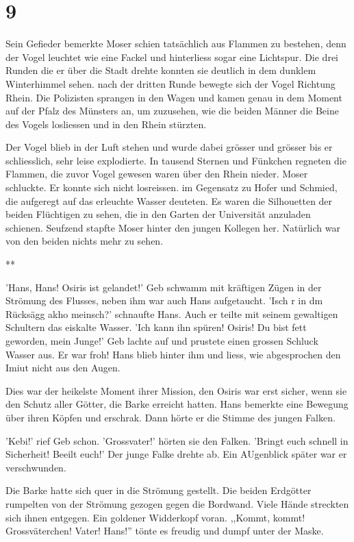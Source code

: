\documentclass[11pt,titlepage,a5paper]{book}
\newcommand{\sterne}{\par{\centering ***\par}}
\begin{document}
\section*{9}

Sein Gefieder bemerkte Moser schien tatsächlich aus Flammen zu bestehen, denn der Vogel leuchtet wie eine Fackel und hinterliess sogar eine Lichtspur. Die drei Runden die er über die Stadt drehte konnten sie deutlich in dem dunklem Winterhimmel sehen. nach der dritten Runde bewegte sich der Vogel Richtung Rhein. Die Polizisten sprangen in den Wagen und kamen genau in dem Moment auf der Pfalz des Münsters an, um zuzusehen, wie die beiden Männer die Beine des Vogels losliessen und in den Rhein stürzten. 


Der Vogel blieb in der Luft stehen und wurde dabei grösser und grösser bis er schliesslich, sehr leise explodierte. In tausend Sternen und Fünkchen regneten die Flammen, die zuvor Vogel gewesen waren über den Rhein nieder. Moser schluckte. Er konnte sich nicht losreissen. im Gegensatz zu Hofer und Schmied, die aufgeregt auf das erleuchte Wasser deuteten. Es waren die Silhouetten der beiden Flüchtigen zu sehen, die in den Garten der Universität anzuladen schienen. Seufzend stapfte Moser hinter den jungen Kollegen her. Natürlich war von den beiden nichts mehr zu sehen.

\sterne

'Hans, Hans! Osiris ist gelandet!' Geb schwamm mit kräftigen Zügen in der Strömung des Flusses, neben ihm war auch Hans aufgetaucht. 'Isch r in dm Rücksägg akho meinsch?' schnaufte Hans. Auch er teilte mit seinem gewaltigen Schultern das eiskalte Wasser. 'Ich kann ihn spüren! Osiris! Du bist fett geworden, mein Junge!' Geb lachte auf und prustete einen grossen Schluck Wasser aus. Er war froh! Hans blieb hinter ihm und liess, wie abgesprochen den Imiut nicht aus den Augen.

Dies war der heikelste Moment ihrer Mission, den Osiris war erst sicher, wenn sie den Schutz aller Götter, die Barke erreicht hatten. Hans bemerkte eine Bewegung über ihren Köpfen und erschrak. Dann hörte er die Stimme des jungen Falken.

'Kebi!' rief Geb schon. 'Grossvater!' hörten sie den Falken. 'Bringt euch schnell in Sicherheit! Beeilt euch!' Der junge Falke drehte ab. Ein AUgenblick später war er verschwunden.

Die Barke hatte sich quer in die Strömung gestellt. Die beiden Erdgötter rumpelten von der Strömung gezogen gegen die Bordwand. Viele Hände streckten sich ihnen entgegen. Ein goldener Widderkopf voran. ,,Kommt, kommt! Grossväterchen! Vater! Hans!'' tönte es freudig und dumpf unter der Maske.
\end{document}
